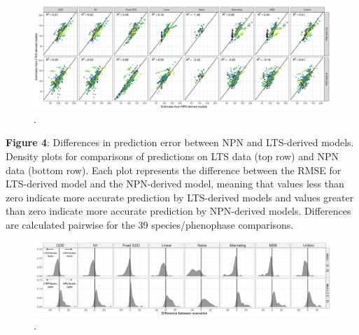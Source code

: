 \documentclass[fleqn,12pt,lineno]{wlpeerj} %
\begin{document}
\newpage

\begin{figure}[H]
	\centering
		\includegraphics[scale=0.5, angle=90]{figure_estimate_compare.png}
	\caption{.}
\end{figure}


\newpage

\textbf{Figure 4}: Differences in prediction error between NPN and LTS-derived models. Density plots for comparisons of predictions on LTS data (top row) and NPN data (bottom row). Each plot represents the difference between the RMSE for LTS-derived model and the NPN-derived model, meaning that values less than zero indicate more accurate prediction by LTS-derived models and values greater than zero indicate more accurate prediction by NPN-derived models. Differences are calculated pairwise for the 39 species/phenophase comparisons.

\newpage

\begin{figure}[H]
	\centering
		\includegraphics[scale=0.4, angle=90]{figure_rmse_metrics_density_plot.png}
	\caption{.}
\end{figure}
\end{document}
